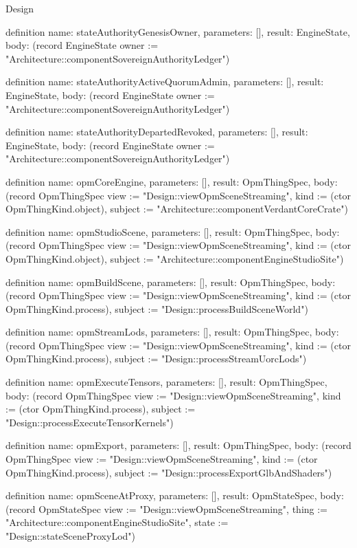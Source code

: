 \begin{lexlean}{Design}
\begin{semanticmodule}
definition{
  name: stateAuthorityGenesisOwner,
  parameters: [],
  result: EngineState,
  body: (record EngineState {owner := "Architecture::componentSovereignAuthorityLedger"})
}

definition{
  name: stateAuthorityActiveQuorumAdmin,
  parameters: [],
  result: EngineState,
  body: (record EngineState {owner := "Architecture::componentSovereignAuthorityLedger"})
}

definition{
  name: stateAuthorityDepartedRevoked,
  parameters: [],
  result: EngineState,
  body: (record EngineState {owner := "Architecture::componentSovereignAuthorityLedger"})
}

definition{
  name: opmCoreEngine,
  parameters: [],
  result: OpmThingSpec,
  body: (record OpmThingSpec {view := "Design::viewOpmSceneStreaming", kind := (ctor OpmThingKind.object), subject := "Architecture::componentVerdantCoreCrate"})
}

definition{
  name: opmStudioScene,
  parameters: [],
  result: OpmThingSpec,
  body: (record OpmThingSpec {view := "Design::viewOpmSceneStreaming", kind := (ctor OpmThingKind.object), subject := "Architecture::componentEngineStudioSite"})
}

definition{
  name: opmBuildScene,
  parameters: [],
  result: OpmThingSpec,
  body: (record OpmThingSpec {view := "Design::viewOpmSceneStreaming", kind := (ctor OpmThingKind.process), subject := "Design::processBuildSceneWorld"})
}

definition{
  name: opmStreamLods,
  parameters: [],
  result: OpmThingSpec,
  body: (record OpmThingSpec {view := "Design::viewOpmSceneStreaming", kind := (ctor OpmThingKind.process), subject := "Design::processStreamUorcLods"})
}

definition{
  name: opmExecuteTensors,
  parameters: [],
  result: OpmThingSpec,
  body: (record OpmThingSpec {view := "Design::viewOpmSceneStreaming", kind := (ctor OpmThingKind.process), subject := "Design::processExecuteTensorKernels"})
}

definition{
  name: opmExport,
  parameters: [],
  result: OpmThingSpec,
  body: (record OpmThingSpec {view := "Design::viewOpmSceneStreaming", kind := (ctor OpmThingKind.process), subject := "Design::processExportGlbAndShaders"})
}

definition{
  name: opmSceneAtProxy,
  parameters: [],
  result: OpmStateSpec,
  body: (record OpmStateSpec {view := "Design::viewOpmSceneStreaming", thing := "Architecture::componentEngineStudioSite", state := "Design::stateSceneProxyLod"})
}


\end{semanticmodule}
\end{lexlean}
